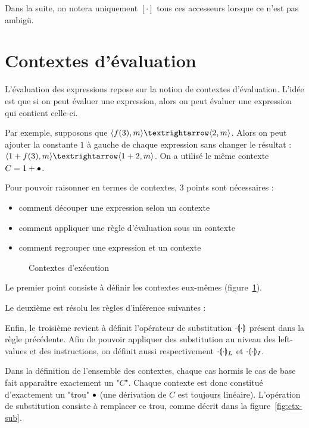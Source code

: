 Dans la suite, on notera uniquement $[\cdot]$ tous ces accesseurs lorsque ce
n'est pas ambigü.

\section{Contextes d'évaluation}

L'évaluation des expressions repose sur la notion de contextes d'évaluation.
L'idée est que si on peut évaluer une expression, alors on peut évaluer une
expression qui contient celle-ci.

Par exemple, supposons que $\mm{m}{f(3)}{m}{2}$. Alors on peut ajouter la
constante $1$ à gauche de chaque expression sans changer le résultat :
$\mm{m}{1+f(3)}{m}{1+2}$. On a utilisé le même contexte
$C = 1+\ctxEmpty$.

Pour pouvoir raisonner en termes de contextes, 3 points sont nécessaires :

\begin{itemize}
\item comment découper une expression selon un contexte
\item comment appliquer une règle d'évaluation sous un contexte
\item comment regrouper une expression et un contexte
\end{itemize}

\begin{figure}
\figctx{}

\caption{Contextes d'exécution}
\label{fig:eval-ctx}
\end{figure}

Le premier point consiste à définir les contextes eux-mêmes
(figure~\ref{fig:eval-ctx}).

Le deuxième est résolu les règles d'inférence suivantes :

\begin{mathpar}


\end{mathpar}

Enfin, le troisième revient à définit l'opérateur de substitution
$\phxx{\ctxSub}$ présent dans la règle précédente. Afin de pouvoir appliquer des
substitution au niveau des left-values et des instructions, on définit aussi
respectivement $\phxx{\ctxSubL}$ et $\phxx{\ctxSubI}$.

Dans la définition de l'ensemble des contextes, chaque cas hormis le cas de base
fait apparaître exactement un "$C$". Chaque contexte est donc constitué
d'exactement un "trou" $\ctxEmpty$ (une dérivation de $C$ est toujours
linéaire). L'opération de substitution consiste à remplacer ce trou, comme
décrit dans la figure~\ref{fig:ctx-sub}.

